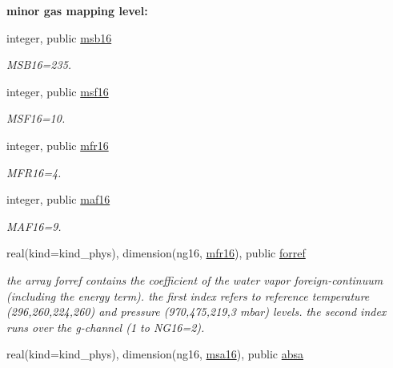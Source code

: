 \begin{Indent}\textbf{ minor gas mapping level\+:}\par
\begin{DoxyCompactItemize}
\item 
integer, public \hyperlink{group__module__radlw__kgbnn_ga18ad5b461d6c71b1aa2d82d5694beb03}{msb16}
\begin{DoxyCompactList}\small\item\em M\+S\+B16=235. \end{DoxyCompactList}\item 
integer, public \hyperlink{group__module__radlw__kgbnn_ga8601911604c1d6a1b32e434159ae95d2}{msf16}
\begin{DoxyCompactList}\small\item\em M\+S\+F16=10. \end{DoxyCompactList}\item 
integer, public \hyperlink{group__module__radlw__kgbnn_ga82777667b951207c62955e3e1492d79d}{mfr16}
\begin{DoxyCompactList}\small\item\em M\+F\+R16=4. \end{DoxyCompactList}\item 
integer, public \hyperlink{group__module__radlw__kgbnn_gaae4c96f4a2ae49c573189f2d63ccd4a3}{maf16}
\begin{DoxyCompactList}\small\item\em M\+A\+F16=9. \end{DoxyCompactList}\item 
real(kind=kind\+\_\+phys), dimension(ng16, \hyperlink{group__module__radlw__kgbnn_ga82777667b951207c62955e3e1492d79d}{mfr16}), public \hyperlink{group__module__radlw__kgbnn_ga4402ed68e18459813a6c9ede5d6ba9cc}{forref}
\begin{DoxyCompactList}\small\item\em the array forref contains the coefficient of the water vapor foreign-\/continuum (including the energy term). the first index refers to reference temperature (296,260,224,260) and pressure (970,475,219,3 mbar) levels. the second index runs over the g-\/channel (1 to N\+G16=2). \end{DoxyCompactList}\item 
real(kind=kind\+\_\+phys), dimension(ng16, \hyperlink{namespacemodule__radlw__kgb16_a95bf5395b579ca6619de3fc40c7ded79}{msa16}), public \hyperlink{group__module__radlw__kgbnn_ga2734b420b7e8e8393a8bf1b595a3cf09}{absa}

\end{DoxyCompactItemize}
\end{Indent}

